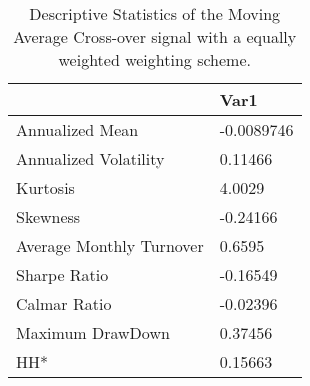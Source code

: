 \begin{table}[H]
\centering
\begin{tabular}{ll}
& Var1 \\ 
\hline 
Annualized Mean & -0.0089746 \\ 
Annualized Volatility & 0.11466 \\ 
Kurtosis & 4.0029 \\ 
Skewness & -0.24166 \\ 
Average Monthly Turnover & 0.6595 \\ 
Sharpe Ratio & -0.16549 \\ 
Calmar Ratio & -0.02396 \\ 
Maximum DrawDown & 0.37456 \\ 
HH* & 0.15663 \\ 
\hline
\end{tabular}
\caption{Descriptive Statistics of the Moving Average Cross-over signal with a equally weighted weighting scheme.}
\label{MAEW}
\end{table}